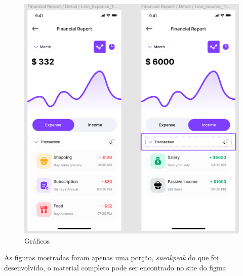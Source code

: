 \begin{figure}[!htb]
    \centering
    \caption{Gráficos}
    \includegraphics[scale=0.6]{images/graphic.png}
\end{figure}


As figuras mostradas foram apenas uma porção, \textit{sneakpeak} do que foi desenvolvido, o material completo pode ser encontrado no site do figma